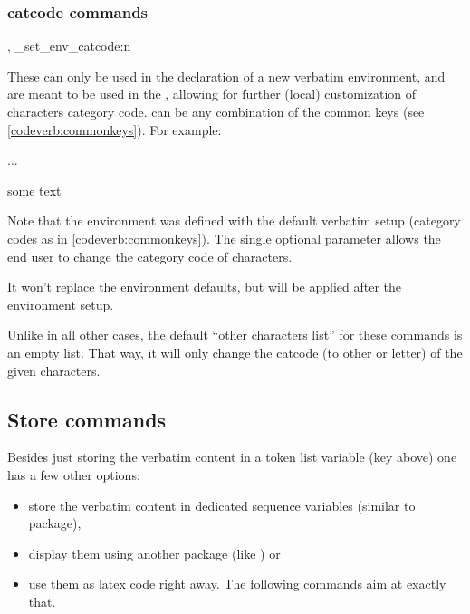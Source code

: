 \documentclass[10pt]{article}
\begin{document}
\subsubsection{catcode commands}\label{codeverb:auxiliary-commands}

\begin{codedescribe}{\cvSetEnvCC , \codeverb_set_env_catcode:n}
\begin{codesyntax}%
\end{codesyntax}
These can only be used in the declaration of a new verbatim environment, and are meant to be used in the , allowing for further (local) customization of characters category code.  can be any combination of the common keys (see \ref{codeverb:commonkeys}). For example:
\end{codedescribe}
\begin{codestore}
    {  }
    { }
  ...
  
  \begin{myEnv}[letter = { @ , \_ }]
    some text
  \end{myEnv}
\end{codestore}


Note that the environment  was defined with the default verbatim setup (category codes as in \ref{codeverb:commonkeys}). The single optional parameter allows the end user to change the category code of characters.
\begin{tsremark}
  It won't replace the environment defaults, but will be applied after the environment setup.
\end{tsremark}
\begin{tsremark}
  Unlike in all other cases, the default ``other characters list'' for these commands is an empty list. That way, it will only change the catcode (to other or letter) of the given characters.
\end{tsremark}

\subsection{Store commands}\label{codeverb:auxiliary}

Besides just storing the verbatim content in a token list variable (key  above) one has a few other options:
\begin{itemize}[nosep]
  \item[(i)] store the verbatim content in dedicated sequence variables (similar to  package), 
  \item[(ii)] display them using another package (like ) or
  \item[(iii)] use them as latex code right away. The following commands aim at exactly that.
\end{itemize} 
\end{document}
